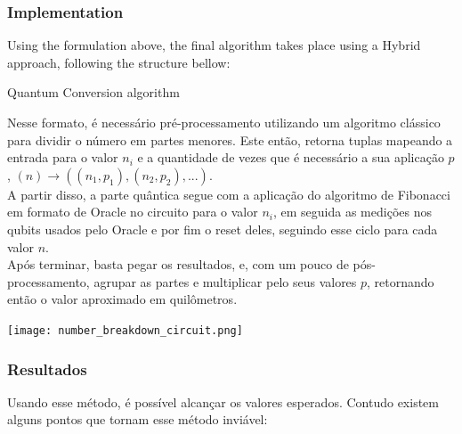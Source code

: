 \documentclass{article}
\begin{document}
\subsubsection{Implementation}

Using the formulation above, the final algorithm takes place using a Hybrid approach, following the structure bellow:

\begin{algorithm}[h]
	\begin{algorithmic}
		\EndFor
			
	\end{algorithmic}
	\caption{Quantum Conversion algorithm}
	\label{alg:miles-to-km-quantum-algortihm}
\end{algorithm}


Nesse formato, é necessário pré-processamento utilizando um algoritmo clássico para dividir o número em partes menores. Este então, retorna tuplas mapeando a entrada para o valor $n_i$ e a quantidade de vezes que é necessário a sua aplicação $p$, $(n) \to ((n_1, p_1), (n_2, p_2), ...)$.\\
A partir disso, a parte quântica segue com a aplicação do algoritmo de Fibonacci em formato de Oracle no circuito para o valor $n_i$, em seguida as medições nos qubits usados pelo Oracle e por fim o reset deles, seguindo esse ciclo para cada valor $n$.\\
Após terminar, basta pegar os resultados, e, com um pouco de pós-processamento, agrupar as partes e multiplicar pelo seus valores $p$, retornando então o valor aproximado em quilômetros.

\begin{center}
	\texttt{[image: number\_breakdown\_circuit.png]}
	\label{fig:miles-km-circuit}
\end{center}

\subsubsection{Resultados}
Usando esse método, é possível alcançar os valores esperados. Contudo existem alguns pontos que tornam esse método inviável:
\end{document}
